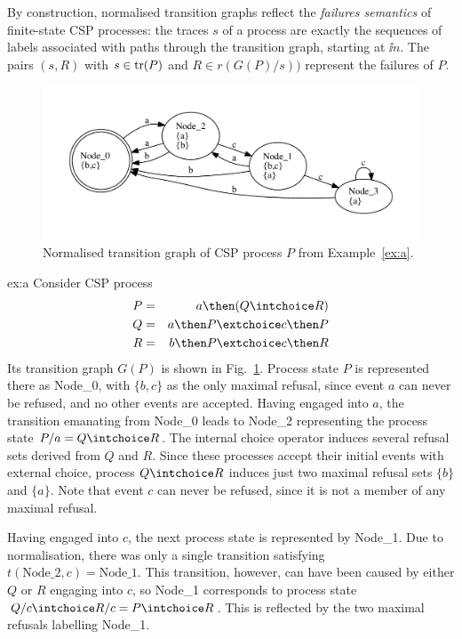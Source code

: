 By construction, normalised transition graphs reflect the \emph{failures semantics} of finite-state CSP processes: 
the traces $s$ of a process are exactly the sequences of labels associated 
with paths through the transition graph, 
starting at $\ii n$. The pairs $(s,R)$ with $s\in\text{tr}(P)$ and 
$R\in r(G(P)/s))$ represent the failures of $P$.


 \begin{figure}
 \begin{center}
\includegraphics[width=\textwidth]{q0.pdf}
\end{center}
\caption{Normalised transition graph of CSP process $P$ from Example~\ref{ex:a}.}
 \label{fig:tga}
 \end{figure}



\begin{example}{ex:a}
Consider CSP process 
\begin{eqnarray*}
P & = & a \then (Q\intchoice R)
\\
Q & = & a \then P \extchoice c \then P
\\
R & = & b \then P \extchoice c \then R
\end{eqnarray*}
Its transition graph $G(P)$ is shown in Fig.~\ref{fig:tga}. Process state $P$ is represented there as Node\_0, with $\{ b,c\}$ as the only maximal refusal, since event $a$ can never be refused, and no other events are accepted. Having engaged into $a$, the transition emanating from Node\_0 leads to Node\_2 representing  the process state 
$P/a = Q\intchoice R$. The internal choice operator induces several refusal sets derived from $Q$ and $R$. Since these processes accept their initial events with external choice, 
process $Q\intchoice R$ induces just two maximal refusal sets $\{b\}$ and
$\{a\}$. Note that event $c$ can never be refused, since it is not a member of any
maximal refusal. 

Having engaged into $c$, the next process state is represented by Node\_1. Due to normalisation, there was only a single transition satisfying 
$t(\text{Node\_2},c) = \text{Node\_1}$. This transition, however, can have been caused 
by either $Q$ or $R$ engaging into $c$, so Node\_1 corresponds to process state
$Q/c \intchoice R/c = P \intchoice R$. This is reflected by the two maximal refusals
labelling Node\_1. 
\end{example}

